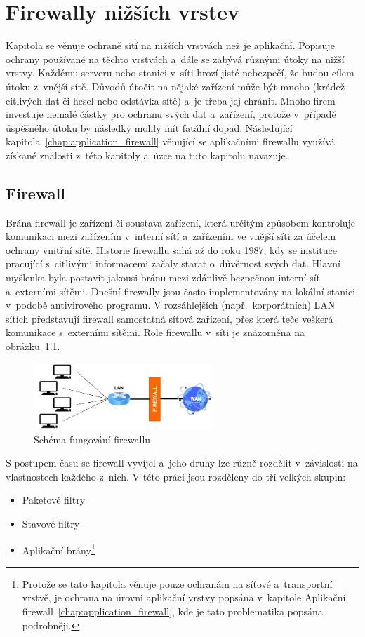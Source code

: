 \chapter{Firewally nižších vrstev}
\label{chap:network_protection}
Kapitola se věnuje ochraně sítí na nižších vrstvách než je aplikační. Popisuje ochrany používané na těchto vrstvách a~dále se zabývá různými útoky na nižší vrstvy. Každému serveru nebo stanici v~síti hrozí jisté nebezpečí, že budou cílem útoku z~vnější sítě. Důvodů útočit na nějaké zařízení může být mnoho (krádež citlivých dat či hesel nebo odstávka sítě) a~je třeba jej chránit. Mnoho firem investuje nemalé částky pro ochranu svých dat a~zařízení, protože v~případě úspěšného útoku by následky mohly mít fatální dopad. Následující kapitola~\ref{chap:application_firewall} věnující se aplikačními firewallu využívá získané znalosti z~této kapitoly a~úzce na tuto kapitolu navazuje.

\section{Firewall}
Brána firewall je zařízení či soustava zařízení, která určitým způsobem kontroluje komunikaci mezi zařízením v~interní sítí a~zařízením ve vnější síti za účelem ochrany vnitřní sítě. Historie firewallu sahá až do roku 1987, kdy se instituce pracující s~citlivými informacemi začaly starat o~důvěrnost svých dat. Hlavní myšlenka byla postavit jakousi bránu mezi zdánlivě bezpečnou interní síť a~externími sítěmi. Dnešní firewally jsou často implementovány na lokální stanici v~podobě antivirového programu. V rozsáhlejších (např.~korporátních) LAN sítích představují firewall samostatná síťová zařízení, přes která teče veškerá komunikace s~externími sítěmi. Role firewallu v~síti je znázorněna na obrázku~\ref{img:firewall}.

\begin{figure}[hbt]
	\centering
	\includegraphics[width=0.6\textwidth]{images/firewall.png}
	\caption{Schéma fungování firewallu}
	\label{img:firewall}
\end{figure}

S postupem času se firewall vyvíjel a~jeho druhy lze různě rozdělit v~závislosti na vlastnostech každého z~nich. V této práci jsou rozděleny \cite{bib:firewall} do tří velkých skupin: 
\begin{itemize}
	\item Paketové filtry
	\item Stavové filtry
	\item Aplikační brány\footnote{Protože se tato kapitola věnuje pouze ochranám na síťové a~transportní vrstvě, je ochrana na úrovni aplikační vrstvy popsána v~kapitole Aplikační firewall~\ref{chap:application_firewall}, kde je tato problematika popsána podrobněji.}
\end{itemize}

